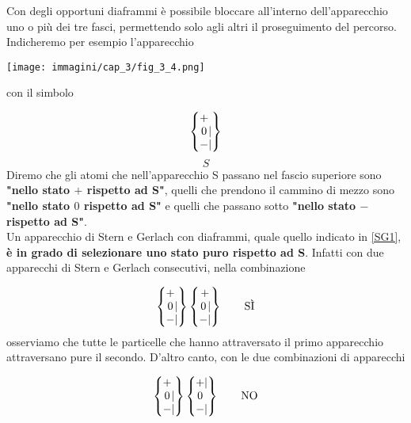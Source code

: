 \documentclass[a4paper,12pt,oneside]{book}
\begin{document}
Con degli opportuni diaframmi è possibile bloccare all'interno dell'apparecchio uno o più dei tre fasci, permettendo solo agli altri il proseguimento del percorso. Indicheremo per esempio l'apparecchio \\
\begin{center}
\texttt{[image: immagini/cap\_3/fig\_3\_4.png]}
\end{center}
 
con il simbolo
 
	\begin{equation}
		\begin{Bmatrix} \makebox[\widthof{$-$}]{$+$}\makebox[\widthof{$|$}]{$\ $} \\ \makebox[\widthof{$-$}]{$0$} | \\ -  |  
		\end{Bmatrix}
	\label{SG1}
	\end{equation}
	\begin{equation*}
		S
	\end{equation*}
Diremo che gli atomi che nell'apparecchio S passano nel fascio superiore sono \textbf{"nello stato $+$ rispetto ad S"}, quelli che prendono il cammino di mezzo sono \textbf{"nello stato $0$ rispetto ad S"} e quelli che passano sotto \textbf{"nello stato $-$ rispetto ad S"}.\\

Un apparecchio di Stern e Gerlach con diaframmi, quale quello indicato in \eqref{SG1}, \textbf{è in grado di selezionare uno stato puro rispetto ad S}. Infatti con due apparecchi di Stern e Gerlach consecutivi, nella combinazione

	\begin{equation}
		\begin{Bmatrix}
 			\makebox[\widthof{$-$}]{$+$}\makebox[\widthof{$|$}]{$\ $} \\ \makebox[\widthof{$-$}]{$0$} | \\ - |  
		\end{Bmatrix}
		\begin{Bmatrix}
			 \makebox[\widthof{$-$}]{$+$} \\ \makebox[\widthof{$-$}]{$0$} | \\ - |  
		\end{Bmatrix} \qquad \text{SÌ}
	\label{SG2}
	\end{equation}
osserviamo che tutte le particelle che hanno attraversato il primo apparecchio attraversano pure il secondo. D'altro canto, con le due combinazioni di apparecchi

	\begin{equation}
		\begin{Bmatrix}
			\makebox[\widthof{$-$}]{$+$}\makebox[\widthof{$|$}]{$\ $} \\ \makebox[\widthof{$-$}]{$0$} | \\ - |  
		\end{Bmatrix}
		\begin{Bmatrix}
 			\makebox[\widthof{$-$}]{$+$} |  \\ \makebox[\widthof{$-$}]{$0$}\makebox[\widthof{$|$}]{$\ $}  \\ - |  
		\end{Bmatrix} \qquad \text{NO}
	\label{SG3}
	\end{equation}
\end{document}
